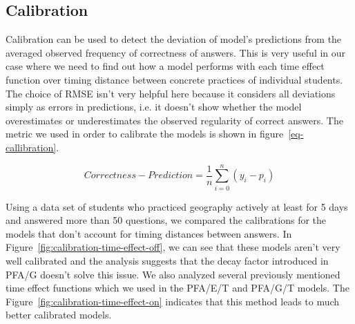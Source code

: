 \subsection{Calibration}
\label{memory-calibration}

Calibration can be used to detect the deviation of model's predictions from the averaged observed frequency of correctness of answers. This is very useful in our case where we need to find out how a model performs with each time effect function over timing distance between concrete practices of individual students. The choice of RMSE isn't very helpful here because it considers all deviations simply as errors in predictions, i.e. it doesn't show whether the model overestimates or underestimates the observed regularity of correct answers. The metric we used in order to calibrate the models is shown in figure~\ref{eq-callibration}.

\begin{equation} \label{eq-callibration}
  \mathit{Correctness} - \mathit{Prediction} = \frac{1}{n} \sum_{i=0}^{n} (y_i - p_i)
\end{equation}

Using a data set of students who practiced geography actively at least for 5 days and answered more than 50 questions, we compared the calibrations for the models that don't account for timing distances between answers. In Figure~\ref{fig:calibration-time-effect-off}, we can see that these models aren't very well calibrated and the analysis suggests that the decay factor introduced in PFA/G doesn't solve this issue. We also analyzed several previously mentioned time effect functions which we used in the PFA/E/T and PFA/G/T models. The Figure~\ref{fig:calibration-time-effect-on} indicates that this method leads to much better calibrated models.

